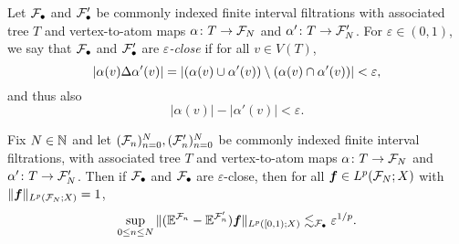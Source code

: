 \begin{figure}
\begin{center}
      \end{center}
\end{figure}

\begin{defn}
  Let $\mathcal{F}_{\bullet}$ and $\mathcal{F}_{\bullet}'$ be commonly indexed finite interval filtrations with associated tree $T$ and vertex-to-atom maps $\alpha \colon T \rightarrow \mathcal{F}_{N}$ and $\alpha' \colon T \rightarrow \mathcal{F}_{N}'$.
  For $\varepsilon \in (0,1)$, we say that $\mathcal{F}_{\bullet}$ and $\mathcal{F}_{\bullet}'$ are \emph{$\varepsilon$-close} if for all $v \in V(T)$,
  \begin{equation*}
    |\alpha(v) \Delta \alpha'(v)| = |(\alpha(v) \cup \alpha'(v)) \setminus (\alpha(v) \cap \alpha'(v))| < \varepsilon,
  \end{equation*}
  and thus also
  \begin{equation*}
    |\alpha(v)| - |\alpha'(v)| < \varepsilon.
  \end{equation*}
\end{defn}

\begin{lem}\label{lem:closeness}
  Fix $N \in \mathbb{N}$ and let $(\mathcal{F}_{n})_{n=0}^{N}, (\mathcal{F}'_{n})_{n=0}^{N}$ be commonly indexed finite interval filtrations, with associated tree $T$ and vertex-to-atom maps $\alpha \colon T \rightarrow \mathcal{F}_{N}$ and $\alpha' \colon T \rightarrow \mathcal{F}_{N}'$.
  Then if $\mathcal{F}_{\bullet}$ and $\mathcal{F}_{\bullet}$ are $\varepsilon$-close, then for all $\bm{f} \in L^p(\mathcal{F}_{N};X)$ with $\|\bm{f}\|_{L^p(\mathcal{F}_{N};X)} = 1$,
  \begin{equation*}
    \sup_{0 \leq n \leq N} \|(\mathbb{E}^{\mathcal{F}_{n}} - \mathbb{E}^{\mathcal{F}_{n}'})\bm{f}\|_{L^p([0,1);X)} \lesssim_{\mathcal{F}_{\bullet}} \varepsilon^{1/p}.
  \end{equation*}
\end{lem}

